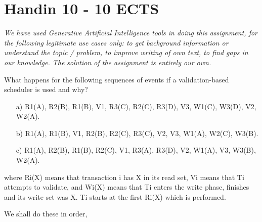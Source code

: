 \documentclass[working, oneside]{../../Preambles/tuftebook}
\begin{document}
\let\cleardoublepage\clearpage
\thispagestyle{fancy}
\chapter{Handin 10 - 10 ECTS}
\textit{We have used Generative Artificial Intelligence tools in doing this
assignment, for the following legitimate use cases only: to get background
information or understand the topic / problem, to improve writing of own text, to
find gaps in our knowledge. The solution of the assignment is entirely our own.}
\begin{exercise}[1]
What happens for the following sequences of events if a validation-based scheduler is used and why?
\begin{enumerate}
    \item[a)] R1(A), R2(B), R1(B), V1, R3(C), R2(C), R3(D), V3, W1(C), W3(D), V2, W2(A).
    \item[b)] R1(A), R1(B), V1, R2(B), R2(C), R3(C), V2, V3, W1(A), W2(C), W3(B).
    \item[c)] R1(A), R2(B), R1(B), R2(C), V1, R3(A), R3(D), V2, W1(A), V3, W3(B), W2(A).
\end{enumerate}
where Ri(X) means that transaction i has X in its read set, Vi means that Ti attempts to validate, and Wi(X) means that Ti enters the write phase, finishes and its write set was X. Ti starts at the first Ri(X) which is performed.
\end{exercise}
We shall do these in order,
\end{document}
